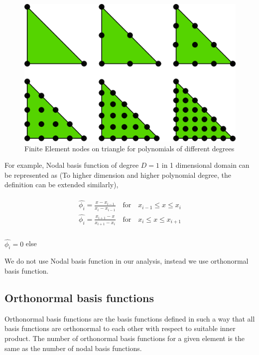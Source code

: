 \documentclass[a4paper,openany]{book}
\begin{document}
\begin{figure}
  \includegraphics[width=\linewidth]{fem_triangle_2.png}
  \caption{Finite Element nodes on triangle for polynomials of different degrees}
  \label{fig:Nodes on Triangular Element}
\end{figure}

For example, Nodal basis function of degree $D=1$ in 1 dimensional domain can be represented as (To higher dimension and higher polynomial degree, the definition can be extended similarly),

\begin{equation}
\begin{aligned}
\begin{split}
\hat{\phi_i} = \frac{x-x_{i-1}}{x_i-x_{i-1}} \quad \textrm{for} \quad x_{i-1} \leq x \leq x_i\\
\hat{\phi_i} = \frac{x_{i+1}-x}{x_{i+1}-x_{i}} \quad \textrm{for} \quad x_{i} \leq x \leq x_{i+1}\\
\end{split}
\end{aligned}
\end{equation}
\begin{center}
$\hat{\phi_i} = 0$ else
\end{center}

We do not use Nodal basis function in our analysis, instead we use orthonormal basis function.

\subsection{Orthonormal basis functions}

Orthonormal basis functions are the basis functions defined in such a way that all basis functions are orthonormal to each other with respect to suitable inner product. The number of orthonormal basis functions for a given element is the same as the number of nodal basis functions. 
\end{document}
